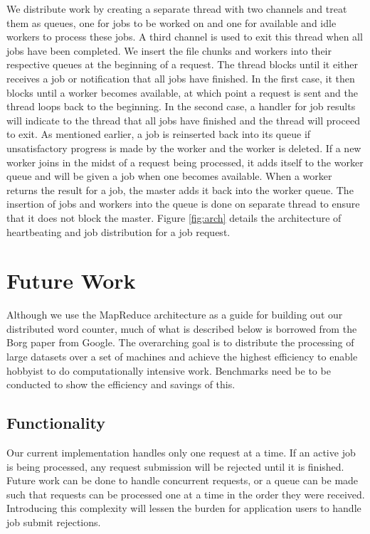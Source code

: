 \documentclass[twoside]{article}
\begin{document}
We distribute work by creating a separate thread with two channels and treat them as queues, one for jobs to be worked on and one for available and idle workers to process these jobs. A third channel is used to exit this thread when all jobs have been completed. We insert the file chunks and workers into their respective queues at the beginning of a request. The thread blocks until it either receives a job or notification that all jobs have
finished. In the first case, it then blocks until a worker becomes available, at which point a request is sent and the thread loops back to the beginning. In the second case, a handler for job results will indicate to the thread that all jobs have finished and the thread will proceed to exit. As mentioned earlier, a job is reinserted back into its queue if unsatisfactory progress is made by the worker and the worker is deleted. If a new worker joins in the midst of a request being processed, it adds itself to the worker queue and will
be given a job when one becomes available. When a worker returns the result for a job, the master adds it back into the worker queue. The insertion of jobs and workers into the queue is done on separate thread to ensure that it does not block the master. Figure \ref{fig:arch} details the architecture of heartbeating and job distribution for a job request.


\section{Future Work}
Although we use the MapReduce \cite{mapreduce} architecture as a guide for building out our distributed word counter, much of what is described below is borrowed from the Borg \cite{borg} paper from Google. The overarching goal is to distribute the processing of large datasets over a set of machines and achieve the highest efficiency to enable hobbyist to do computationally intensive work. Benchmarks need be to be conducted to show the efficiency and savings of this.
\subsection{Functionality}
Our current implementation handles only one request at a time. If an active job is being processed, any request submission will be rejected until it is finished. Future work can be done to handle concurrent requests, or a queue can be made such that requests can be processed one at a time in the order they were received. Introducing this complexity will lessen the burden for application users to handle job submit rejections. 
\end{document}

